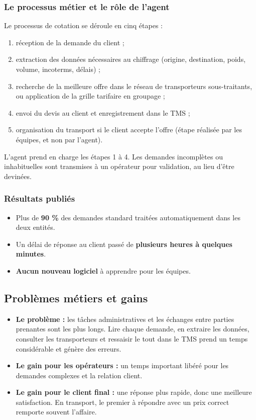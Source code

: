 \documentclass[11pt,a4paper]{article}
\begin{document}
\subsubsection{Le processus métier et le rôle de l'agent}
Le processus de cotation se déroule en cinq étapes :
\begin{enumerate}
  \item réception de la demande du client ;
  \item extraction des données nécessaires au chiffrage (origine, destination, poids, volume, incoterms, délais) ;
  \item recherche de la meilleure offre dans le réseau de transporteurs sous-traitants, ou application de la grille tarifaire en groupage ;
  \item envoi du devis au client et enregistrement dans le TMS ;
  \item organisation du transport si le client accepte l'offre (étape réalisée par les équipes, et non par l'agent).
\end{enumerate}
L'agent prend en charge les étapes 1 à 4. Les demandes incomplètes ou inhabituelles sont transmises à un opérateur pour validation, au lieu d'être devinées.

\subsubsection{Résultats publiés}
\begin{itemize}
  \item Plus de \textbf{90 \%} des demandes standard traitées automatiquement dans les deux entités.
  \item Un délai de réponse au client passé de \textbf{plusieurs heures à quelques minutes}.
  \item \textbf{Aucun nouveau logiciel} à apprendre pour les équipes.
\end{itemize}

\subsection{Problèmes métiers et gains}
\begin{itemize}
  \item \textbf{Le problème :} les tâches administratives et les échanges entre parties prenantes sont les plus longs. Lire chaque demande, en extraire les données, consulter les transporteurs et ressaisir le tout dans le TMS prend un temps considérable et génère des erreurs.
  \item \textbf{Le gain pour les opérateurs :} un temps important libéré pour les demandes complexes et la relation client.
  \item \textbf{Le gain pour le client final :} une réponse plus rapide, donc une meilleure satisfaction. En transport, le premier à répondre avec un prix correct remporte souvent l'affaire.
\end{itemize}
\end{document}

